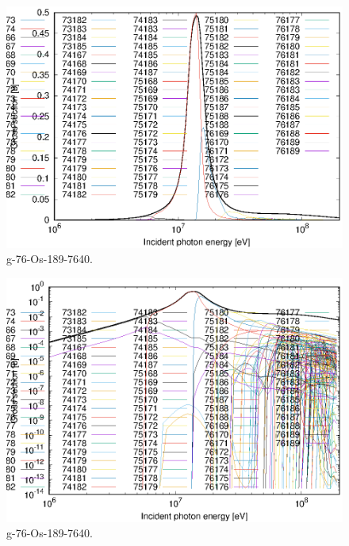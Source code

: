 \begin{figure}
 \includegraphics[width=\linewidth]{eps/g_76-Os-189_7640.eps}
  \caption{g-76-Os-189-7640.}
\end{figure}
\begin{figure}
 \includegraphics[width=\linewidth]{eps-log/g_76-Os-189_7640.eps}
 \caption{g-76-Os-189-7640.}
\end{figure}
\newpage \clearpage

